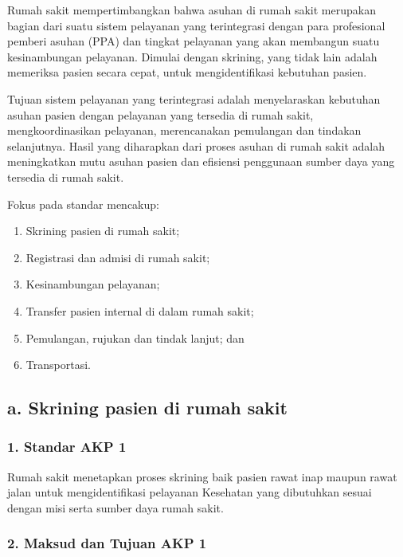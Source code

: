 \documentclass[
]{book}
\providecommand{\tightlist}{%
  \setlength{\itemsep}{0pt}\setlength{\parskip}{0pt}}
\begin{document}
Rumah sakit mempertimbangkan bahwa asuhan di rumah sakit merupakan bagian dari suatu sistem pelayanan yang terintegrasi dengan para profesional pemberi asuhan (PPA) dan tingkat pelayanan yang akan membangun suatu kesinambungan pelayanan. Dimulai dengan skrining, yang tidak lain adalah memeriksa pasien secara cepat, untuk mengidentifikasi kebutuhan pasien.

Tujuan sistem pelayanan yang terintegrasi adalah menyelaraskan kebutuhan asuhan pasien dengan pelayanan yang tersedia di rumah sakit, mengkoordinasikan pelayanan, merencanakan pemulangan dan tindakan selanjutnya. Hasil yang diharapkan dari proses asuhan di rumah sakit adalah meningkatkan mutu asuhan pasien dan efisiensi penggunaan sumber daya yang tersedia di rumah sakit.

Fokus pada standar mencakup:

\begin{enumerate}
\def\labelenumi{\alph{enumi}.}
\tightlist
\item
  Skrining pasien di rumah sakit;
\item
  Registrasi dan admisi di rumah sakit;
\item
  Kesinambungan pelayanan;
\item
  Transfer pasien internal di dalam rumah sakit;
\item
  Pemulangan, rujukan dan tindak lanjut; dan
\item
  Transportasi.
\end{enumerate}

\hypertarget{a.-skrining-pasien-di-rumah-sakit}{%
\subsection*{a. Skrining pasien di rumah sakit}\label{a.-skrining-pasien-di-rumah-sakit}}

\hypertarget{standar-akp-1}{%
\subsubsection*{1. Standar AKP 1}\label{standar-akp-1}}

Rumah sakit menetapkan proses skrining baik pasien rawat inap maupun rawat jalan untuk mengidentifikasi pelayanan Kesehatan yang dibutuhkan sesuai dengan misi serta sumber daya rumah sakit.

\hypertarget{maksud-dan-tujuan-akp-1}{%
\subsubsection*{2. Maksud dan Tujuan AKP 1}\label{maksud-dan-tujuan-akp-1}}
\end{document}
